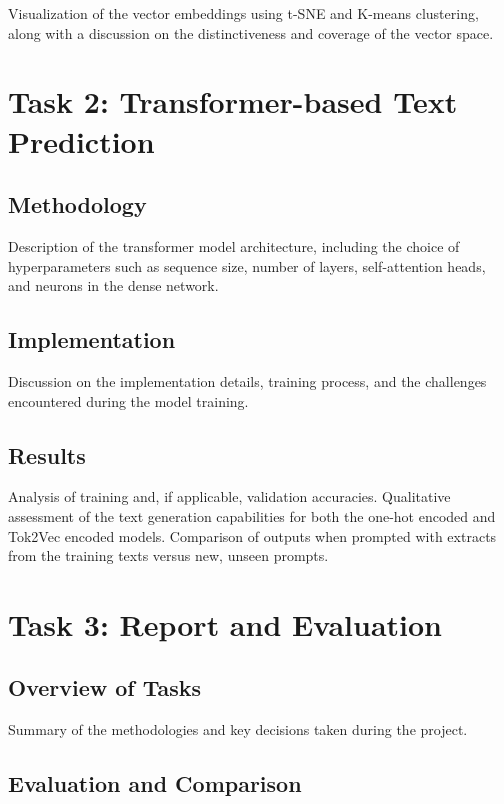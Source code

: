 \documentclass[12pt]{article} \usepackage{COSC420style} \usepackage{soul}
\begin{document}
Visualization of the vector embeddings using t-SNE and K-means clustering, along with a discussion
on the distinctiveness and coverage of the vector space.

\section{Task 2: Transformer-based Text Prediction}

\subsection{Methodology}

Description of the transformer model architecture, including the choice of hyperparameters such as
sequence size, number of layers, self-attention heads, and neurons in the dense network.

\subsection{Implementation}

Discussion on the implementation details, training process, and the challenges encountered during
the model training.

\subsection{Results}

Analysis of training and, if applicable, validation accuracies. Qualitative assessment of the text
generation capabilities for both the one-hot encoded and Tok2Vec encoded models. Comparison of
outputs when prompted with extracts from the training texts versus new, unseen prompts.

\section{Task 3: Report and Evaluation}

\subsection{Overview of Tasks}

Summary of the methodologies and key decisions taken during the project.

\subsection{Evaluation and Comparison}
\end{document}
